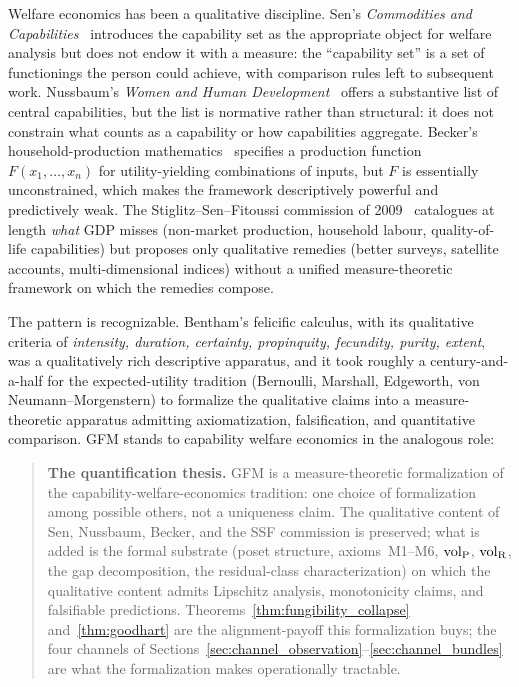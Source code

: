 Welfare economics has been a qualitative discipline.  Sen's
\emph{Commodities and Capabilities}~\citep{sen1985commodities}
introduces the capability set as the appropriate object for
welfare analysis but does not endow it with a measure: the
``capability set'' is a set of functionings the person could
achieve, with comparison rules left to subsequent
work.  Nussbaum's \emph{Women and Human
Development}~\citep{nussbaum2000women} offers a substantive list
of central capabilities, but the list is normative rather than
structural: it does not constrain what counts as a capability or
how capabilities aggregate.  Becker's household-production
mathematics~\citep{becker1965theory,becker1981treatise}
specifies a production function $F(x_1, \dots, x_n)$ for
utility-yielding combinations of inputs, but $F$ is essentially
unconstrained, which makes the framework descriptively powerful and
predictively weak.  The Stiglitz--Sen--Fitoussi commission of
2009~\citep{stiglitz2009report} catalogues at length
\emph{what} GDP misses (non-market production, household labour,
quality-of-life capabilities) but proposes only qualitative
remedies (better surveys, satellite accounts, multi-dimensional
indices) without a unified measure-theoretic framework on which the
remedies compose.

The pattern is recognizable.  Bentham's felicific calculus,
with its qualitative criteria of \emph{intensity, duration,
certainty, propinquity, fecundity, purity, extent}, was a
qualitatively rich descriptive
apparatus, and it took roughly a century-and-a-half for the
expected-utility tradition (Bernoulli, Marshall, Edgeworth, von
Neumann--Morgenstern) to formalize the qualitative claims into a
measure-theoretic apparatus admitting axiomatization, falsification,
and quantitative comparison.  GFM stands to capability welfare
economics in the analogous role:

\begin{quote}
\textbf{The quantification thesis.}  GFM is a measure-theoretic
formalization of the capability-welfare-economics tradition: one
choice of formalization among possible others, not a uniqueness
claim.  The qualitative content of Sen, Nussbaum, Becker, and the
SSF commission is preserved; what is added is the formal substrate
(poset structure, axioms~M1--M6, ${\operatorname{vol}_{\mathrm{P}}}$, ${\operatorname{vol}_{\mathrm{R}}}$, the
gap decomposition, the residual-class characterization) on which
the qualitative content admits Lipschitz analysis, monotonicity
claims, and falsifiable predictions.  Theorems~\ref{thm:fungibility_collapse}
and~\ref{thm:goodhart} are the alignment-payoff this
formalization buys; the four channels of
Sections~\ref{sec:channel_observation}--\ref{sec:channel_bundles}
are what the formalization makes operationally tractable.
\end{quote}

